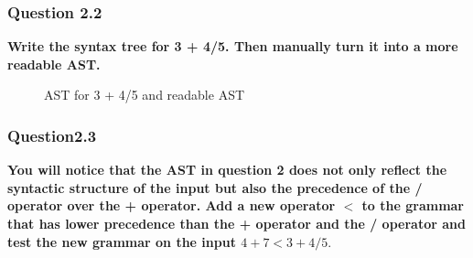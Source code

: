         

    \subsubsection{Question 2.2}
        \textbf{Write the syntax tree for 3 + 4/5. Then manually turn it into a more readable AST.}
            
            \begin{figure}[H]%
                \centering
                \qquad
                \caption{AST for 3 + 4/5 and readable AST}
                \label{fig:example}%
            \end{figure}

    \subsubsection{Question2.3}
        \textbf{You will notice that the AST in question 2 does not only reflect the syntactic structure of the
    input but also the precedence of the / operator over the + operator. Add a new operator $<$ to
    the grammar that has lower precedence than the + operator and the / operator and test the
    new grammar on the input $4+7 < 3 + 4/5.$}
    
    

